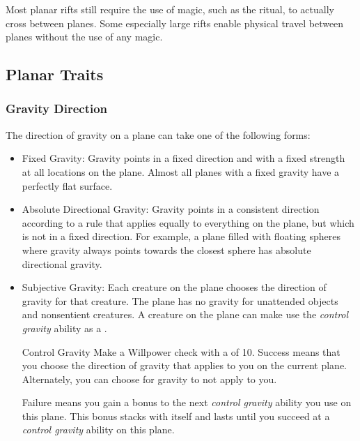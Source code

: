         Most planar rifts still require the use of magic, such as the  ritual, to actually cross between planes.
        Some especially large rifts enable physical travel between planes without the use of any magic.

    \subsection{Planar Traits}
        \subsubsection{Gravity Direction}
            The direction of gravity on a plane can take one of the following forms:
            \begin{itemize}
                \item Fixed Gravity: Gravity points in a fixed direction and with a fixed strength at all locations on the plane.
                    Almost all planes with a fixed gravity have a perfectly flat surface.
                \item Absolute Directional Gravity: Gravity points in a consistent direction according to a rule that applies equally to everything on the plane, but which is not in a fixed direction.
                    For example, a plane filled with floating spheres where gravity always points towards the closest sphere has absolute directional gravity.
                \item Subjective Gravity: Each creature on the plane chooses the direction of gravity for that creature.
                    The plane has no gravity for unattended objects and nonsentient creatures.
                    A creature on the plane can make use the \textit{control gravity} ability as a .
                    \begin{freeability}{Control Gravity}
                        Make a Willpower check with a  of 10.
                        Success means that you choose the direction of gravity that applies to you on the current plane.
                        Alternately, you can choose for gravity to not apply to you.

                        Failure means you gain a  bonus to the next \textit{control gravity} ability you use on this plane.
                        This bonus stacks with itself and lasts until you succeed at a \textit{control gravity} ability on this plane.
                    \end{freeability}
            \end{itemize}

